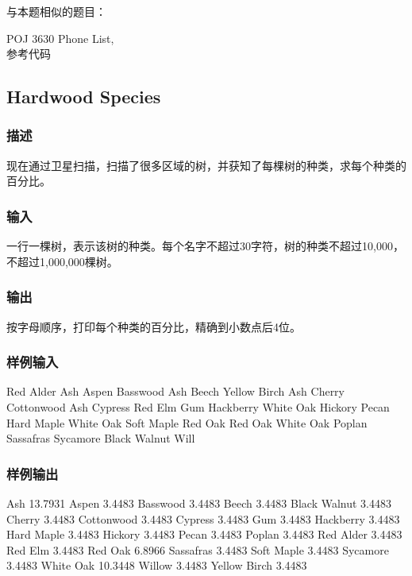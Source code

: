 与本题相似的题目：
\begindot
\item POJ 3630 Phone List,  \\参考代码 
\myenddot


\subsection{Hardwood Species}


\subsubsection{描述}
现在通过卫星扫描，扫描了很多区域的树，并获知了每棵树的种类，求每个种类的百分比。


\subsubsection{输入}
一行一棵树，表示该树的种类。每个名字不超过30字符，树的种类不超过10,000，不超过1,000,000棵树。


\subsubsection{输出}
按字母顺序，打印每个种类的百分比，精确到小数点后4位。

\subsubsection{样例输入}
\begin{Code}
Red Alder
Ash
Aspen
Basswood
Ash
Beech
Yellow Birch
Ash
Cherry
Cottonwood
Ash
Cypress
Red Elm
Gum
Hackberry
White Oak
Hickory
Pecan
Hard Maple
White Oak
Soft Maple
Red Oak
Red Oak
White Oak
Poplan
Sassafras
Sycamore
Black Walnut
Will
\end{Code}

\subsubsection{样例输出}
\begin{Code}
Ash 13.7931
Aspen 3.4483
Basswood 3.4483
Beech 3.4483
Black Walnut 3.4483
Cherry 3.4483
Cottonwood 3.4483
Cypress 3.4483
Gum 3.4483
Hackberry 3.4483
Hard Maple 3.4483
Hickory 3.4483
Pecan 3.4483
Poplan 3.4483
Red Alder 3.4483
Red Elm 3.4483
Red Oak 6.8966
Sassafras 3.4483
Soft Maple 3.4483
Sycamore 3.4483
White Oak 10.3448
Willow 3.4483
Yellow Birch 3.4483
\end{Code}

